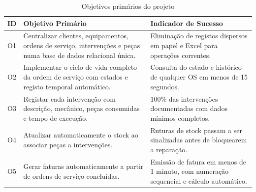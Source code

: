 \documentclass[a4paper,12pt]{scrreprt}
\begin{document}
        \begin{table}[H]
            \centering
            \small
            \begin{tabular}{|p{1.3cm}|p{8cm}|p{5cm}|}
                \hline
                \rowcolor{gray!20!white}
                \textbf{ID} & \textbf{Objetivo Primário} & \textbf{Indicador de Sucesso} \\
                \hline
                O1 & Centralizar clientes, equipamentos, ordens de serviço, intervenções e peças numa base de dados relacional única. & Eliminação de registos dispersos em papel e Excel para operações correntes. \\
                \hline
                O2 & Implementar o ciclo de vida completo da ordem de serviço com estados e registo temporal automático. & Consulta do estado e histórico de qualquer OS em menos de 15 segundos. \\
                \hline
                O3 & Registar cada intervenção com descrição, mecânico, peças consumidas e tempo de execução. & 100\% das intervenções documentadas com dados mínimos completos. \\
                \hline
                O4 & Atualizar automaticamente o stock ao associar peças a intervenções. & Ruturas de stock passam a ser sinalizadas antes de bloquearem a reparação. \\
                \hline
                O5 & Gerar faturas automaticamente a partir de ordens de serviço concluídas. & Emissão de fatura em menos de 1 minuto, com numeração sequencial e cálculo automático. \\
                \hline
            \end{tabular}
            \caption{Objetivos primários do projeto}
        \end{table}
\end{document}
